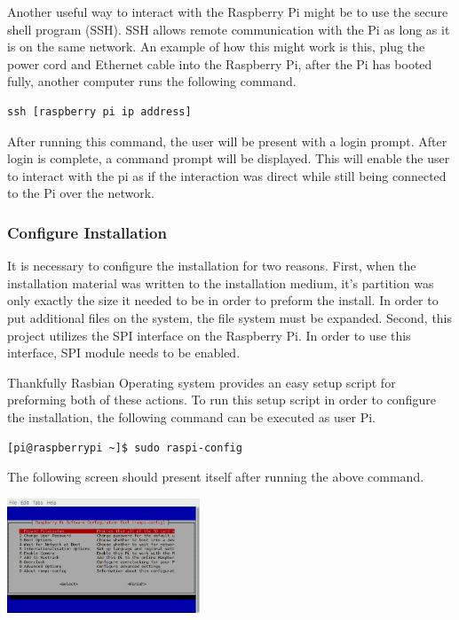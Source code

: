 \documentclass{article}	%
\begin{document}
\begin{multicols}{2}
Another useful way to interact with the Raspberry Pi
might be to use the secure shell program (SSH).
SSH allows remote communication with the Pi as
long as it is on the same network.
An example of how this might work is this,
plug the power cord and Ethernet cable into
the Raspberry Pi,
after the Pi has booted fully,
another computer runs the following command.
\begin{lstlisting}
ssh [raspberry pi ip address]
\end{lstlisting}
After running this command,
the user will be present with a login prompt.
After login is complete,
a command prompt will be displayed.
This will enable the user to interact with the pi
as if the interaction was direct while still
being connected to the Pi over the network.

\subsubsection{Configure Installation}
It is necessary to configure the installation
for two reasons.
First, when the installation material was
written to the installation medium,
it's partition was only exactly the size it needed to be in order to 
preform the install.
In order to put additional files on the system,
the file system must be expanded.
Second, this project utilizes the SPI interface
on the Raspberry Pi.
In order to use this interface,
SPI module needs to be enabled.

Thankfully Rasbian Operating system
provides an easy setup script for preforming 
both of these actions.
To run this setup script in order to configure the
installation,
the following command can be executed as user Pi.

\begin{lstlisting}
[pi@raspberrypi ~]$ sudo raspi-config
\end{lstlisting}

The following screen should present itself
after running the above command.

\begin{center}
\includegraphics[width=0.43\textwidth,keepaspectratio]{raspi_config.png}
\end{center}


\end{multicols}
\end{document}
